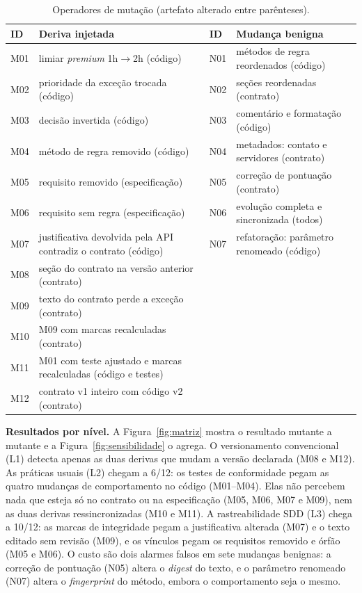 \documentclass[12pt]{article}
\begin{document}
\begin{table}[!ht]
\centering
\caption{Operadores de mutação (artefato alterado entre parênteses).}
\label{tab:mutantes}
\scriptsize
\begin{tabularx}{\linewidth}{l X l X}
\toprule
\textbf{ID} & \textbf{Deriva injetada} & \textbf{ID} & \textbf{Mudança benigna} \\
\midrule
M01 & limiar \textit{premium} 1h$\rightarrow$2h (código) & N01 & métodos de regra reordenados (código) \\
M02 & prioridade da exceção trocada (código) & N02 & seções reordenadas (contrato) \\
M03 & decisão invertida (código) & N03 & comentário e formatação (código) \\
M04 & método de regra removido (código) & N04 & metadados: contato e servidores (contrato) \\
M05 & requisito removido (especificação) & N05 & correção de pontuação (contrato) \\
M06 & requisito sem regra (especificação) & N06 & evolução completa e sincronizada (todos) \\
M07 & justificativa devolvida pela API contradiz o contrato (código) & N07 & refatoração: parâmetro renomeado (código) \\
M08 & seção do contrato na versão anterior (contrato) & & \\
M09 & texto do contrato perde a exceção (contrato) & & \\
M10 & M09 com marcas recalculadas (contrato) & & \\
M11 & M01 com teste ajustado e marcas recalculadas (código e testes) & & \\
M12 & contrato v1 inteiro com código v2 (contrato) & & \\
\bottomrule
\end{tabularx}
\end{table}

\textbf{Resultados por nível.} A Figura~\ref{fig:matriz} mostra o resultado mutante a mutante e a Figura~\ref{fig:sensibilidade} o agrega. O versionamento convencional (L1) detecta apenas as duas derivas que mudam a versão declarada (M08 e M12). As práticas usuais (L2) chegam a 6/12: os testes de conformidade pegam as quatro mudanças de comportamento no código (M01--M04). Elas não percebem nada que esteja só no contrato ou na especificação (M05, M06, M07 e M09), nem as duas derivas ressincronizadas (M10 e M11). A rastreabilidade SDD (L3) chega a 10/12: as marcas de integridade pegam a justificativa alterada (M07) e o texto editado sem revisão (M09), e os vínculos pegam os requisitos removido e órfão (M05 e M06). O custo são dois alarmes falsos em sete mudanças benignas: a correção de pontuação (N05) altera o \textit{digest} do texto, e o parâmetro renomeado (N07) altera o \textit{fingerprint} do método, embora o comportamento seja o mesmo.
\end{document}
